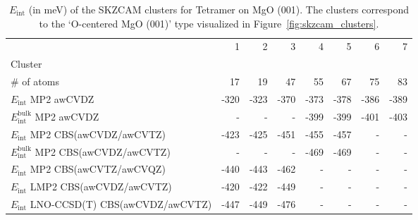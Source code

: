 \begin{table}
\caption{\label{tab:system_eint_mgo_ch3oh_tetramer}$E_\textrm{int}$ (in meV) of the SKZCAM clusters for Tetramer  on MgO (001). The clusters correspond to the `O-centered MgO (001)' type visualized in Figure~\ref{fig:skzcam_clusters}.}
\begin{adjustbox}{center,max width=1.4\textwidth}
\begin{tabular}{lrrrrrrr}
\toprule
 & 1 & 2 & 3 & 4 & 5 & 6 & 7 \\ 
Cluster &  &  &  &  &  &  &  \\
\midrule
\# of atoms & 17 & 19 & 47 & 55 & 67 & 75 & 83 \\
$E_\textrm{int}$ MP2 awCVDZ & -320 & -323 & -370 & -373 & -378 & -386 & -389 \\
$E_\textrm{int}^\textrm{bulk}$ MP2 awCVDZ & - & - & - & -399 & -399 & -401 & -403 \\
$E_\textrm{int}$ MP2 CBS(awCVDZ/awCVTZ) & -423 & -425 & -451 & -455 & -457 & - & - \\
$E_\textrm{int}^\textrm{bulk}$ MP2 CBS(awCVDZ/awCVTZ) & - & - & - & -469 & -469 & - & - \\
$E_\textrm{int}$ MP2 CBS(awCVTZ/awCVQZ) & -440 & -443 & -462 & - & - & - & - \\
$E_\textrm{int}$ LMP2 CBS(awCVDZ/awCVTZ) & -420 & -422 & -449 & - & - & - & - \\
$E_\textrm{int}$ LNO-CCSD(T) CBS(awCVDZ/awCVTZ) & -447 & -449 & -476 & - & - & - & - \\
\bottomrule
\end{tabular}
\end{adjustbox}
\end{table}

